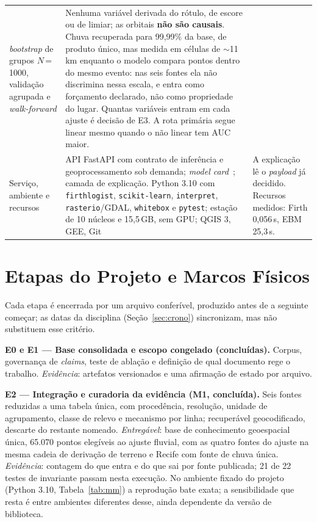 \documentclass[conference]{IEEEtran}
\begin{document}
\begin{table}[!t]
\begin{tabular}{@{}>{\raggedright\arraybackslash}p{2.05cm}>{\raggedright\arraybackslash}p{7.6cm}>{\raggedright\arraybackslash}p{6.5cm}@{}}
\emph{bootstrap} de grupos $N$\,=\,1000, validação agrupada e \emph{walk-forward} &
Nenhuma variável derivada do rótulo, de escore ou de limiar; as orbitais \textbf{não
são causais}. Chuva recuperada para 99,99\% da base, de produto único, mas medida em
células de $\sim$11\,km enquanto o modelo compara pontos dentro do mesmo evento: nas
seis fontes ela não discrimina nessa escala, e entra como forçamento declarado, não
como propriedade do lugar. Quantas variáveis entram em cada ajuste é decisão de E3. A rota primária segue linear mesmo quando o
não linear tem AUC maior. \\
Serviço, ambiente e recursos &
API FastAPI com contrato de inferência e geoprocessamento sob demanda; \emph{model
card}~\cite{mitchell2019}; camada de explicação. Python 3.10 com \texttt{firthlogist},
\texttt{scikit-learn}, \texttt{interpret}, \texttt{rasterio}/GDAL, \texttt{whitebox} e
\texttt{pytest}; estação de 10 núcleos e 15,5\,GB, sem GPU; QGIS 3, GEE, Git &
A explicação lê o \emph{payload} já decidido. Recursos medidos: Firth 0,056\,s,
EBM 25,3\,s. \\
\bottomrule
\end{tabular}
\end{table}

\section{Etapas do Projeto e Marcos Físicos}
\label{sec:etapas}

Cada etapa é encerrada por um arquivo conferível, produzido antes de a seguinte
começar; as datas da disciplina (Seção~\ref{sec:crono}) sincronizam, mas não
substituem esse critério.

\textbf{E0 e E1 --- Base consolidada e escopo congelado (concluídas).} Corpus,
governança de \emph{claims}, teste de ablação e definição de qual documento rege
o trabalho. \emph{Evidência}: artefatos versionados e uma afirmação de estado por
arquivo.

\textbf{E2 --- Integração e curadoria da evidência (M1, concluída).} Seis fontes
reduzidas a uma tabela única, com procedência, resolução, unidade de
agrupamento, classe de relevo e mecanismo por linha; recuperável geocodificado,
descarte do restante nomeado. \emph{Entregável}: base de conhecimento
geoespacial única, 65.070 pontos elegíveis ao ajuste fluvial, com as quatro
fontes do ajuste na mesma cadeia de derivação de terreno e Recife com fonte de
chuva única. \emph{Evidência}: contagem do que entra e do que sai por fonte
publicada; 21 de 22 testes de invariante passam nesta execução. No ambiente
fixado do projeto (Python 3.10, Tabela~\ref{tab:mm}) a reprodução bate exata;
a sensibilidade que resta é entre ambientes diferentes desse, ainda dependente
da versão de biblioteca.
\end{document}
